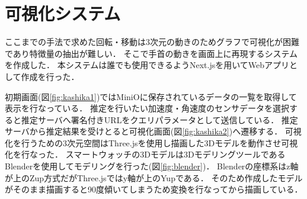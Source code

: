 \section{可視化システム}
ここまでの手法で求めた回転・移動は3次元の動きのためグラフで可視化が困難であり特徴量の抽出が難しい．
そこで手首の動きを画面上に再現するシステムを作成した．
本システムは誰でも使用できるようNext.jsを用いてWebアプリとして作成を行った．

初期画面(図\ref{fig:kashika1})ではMiniOに保存されているデータの一覧を取得して表示を行なっている．
推定を行いたい加速度・角速度のセンサデータを選択すると推定サーバへ署名付きURLをクエリパラメータとして送信している．
推定サーバから推定結果を受けとると可視化画面(図\ref{fig:kashika2})へ遷移する．
可視化を行うための3次元空間はThree.jsを使用し描画した3Dモデルを動作させ可視化を行なった．
スマートウォッチの3Dモデルは3DモデリングツールであるBlenderを使用してモデリングを行った(図\ref{fig:blender})．
Blenderの座標系はz軸が上のZup方式だがThree.jsではy軸が上のYupである．
そのため作成したモデルがそのまま描画すると90度傾いてしまうため変換を行なってから描画している．

